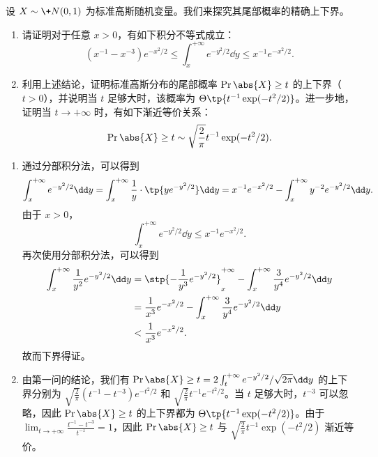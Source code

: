 \begin{exercise}
设 $X \sim \+N(0, 1)$ 为标准高斯随机变量。我们来探究其尾部概率的精确上下界。
\begin{enumerate}
    \item 请证明对于任意 $x > 0$，有如下积分不等式成立：
    \[
        (x^{-1} - x^{-3})e^{-x^2/2} \le \int_x^{+\infty} e^{-y^2/2} \dd y \le x^{-1} e^{-x^2/2}.
    \]
    \item 利用上述结论，证明标准高斯分布的尾部概率 $\Pr{\abs{X} \ge t}$ 的上下界（$t>0$），并说明当 $t$ 足够大时，该概率为 $\Theta\tp{t^{-1} \exp(-t^2/2)}$。进一步地，证明当 $t \to +\infty$ 时，有如下渐近等价关系：
    \[
        \Pr{\abs{X} \ge t} \sim \sqrt{\frac{2}{\pi}} t^{-1} \exp(-t^2/2).
    \]
\end{enumerate}
\end{exercise}
\begin{solution}
    \begin{enumerate}
        \item 通过分部积分法，可以得到 \[
            \int_x^{+\infty} e^{-y^2/2} \dd y =  \int_x^{+\infty} \frac{1}{y} \cdot \tp{ y e^{-y^2/2} } \dd y = x^{-1} e^{-x^2/2} - \int_x^{+\infty} y^{-2} e^{-y^2/2} \dd y.
        \]
        由于 $x>0$，
        \[
            \int_x^{+\infty} e^{-y^2/2} \dd y \le x^{-1} e^{-x^2/2}.
        \]
        再次使用分部积分法，可以得到
        \begin{align*}
            \int_x^{+\infty} \frac{1}{y^2} e^{-y^2/2} \dd y &= \stp{ -\frac{1}{y^3} e^{-y^2/2} }_x^{+\infty} - \int_x^{+\infty} \frac{3}{y^4} e^{-y^2/2} \dd y\\
            &= \frac{1}{x^3} e^{-x^2/2} - \int_x^{+\infty} \frac{3}{y^4} e^{-y^2/2} \dd y\\
            &< \frac{1}{x^3} e^{-x^2/2}.
        \end{align*}
        故而下界得证。
        \item 由第一问的结论，我们有 $\Pr{\abs{X} \ge t} = 2\int_t^{+\infty} e^{-y^2/2}/\sqrt{2\pi}\dd y$ 的上下界分别为 $\sqrt{\frac{2}{\pi}} (t^{-1}-t^{-3})e^{-t^2/2}$ 和 $\sqrt{\frac{2}{\pi}} t^{-1} e^{-t^2/2}$。当 $t$ 足够大时，$t^{-3}$ 可以忽略，因此 $\Pr{\abs{X} \ge t}$ 的上下界都为 $\Theta\tp{t^{-1}\exp(-t^2/2)}$。由于 $\lim_{t\to +\infty}\frac{t^{-1}-t^{-3}}{t^{-1}} = 1$，因此 $\Pr{\abs{X} \ge t}$ 与 $\sqrt{\frac{2}{\pi}} t^{-1}\exp(-t^2/2)$ 渐近等价。
    \end{enumerate}
\end{solution}

